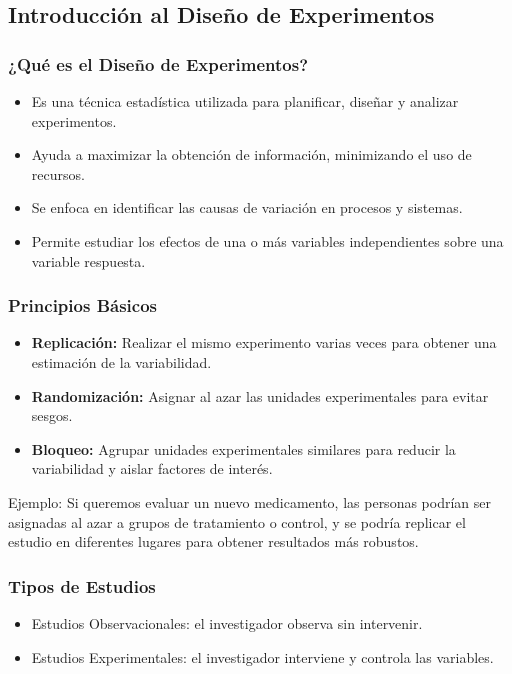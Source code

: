 \documentclass[aspectratio=169]{beamer}
\begin{document}
\subsection{Introducción al Diseño de Experimentos}
\begin{frame}
\frametitle{¿Qué es el Diseño de Experimentos?}
\begin{itemize}
    \item Es una técnica estadística utilizada para planificar, diseñar y analizar experimentos.
    \item Ayuda a maximizar la obtención de información, minimizando el uso de recursos.
    \item Se enfoca en identificar las causas de variación en procesos y sistemas.
    \item Permite estudiar los efectos de una o más variables independientes sobre una variable respuesta.
\end{itemize}
\end{frame}

\begin{frame}
\frametitle{Principios Básicos}
\begin{itemize}
    \item \textbf{Replicación:} Realizar el mismo experimento varias veces para obtener una estimación de la variabilidad.
    \item \textbf{Randomización:} Asignar al azar las unidades experimentales para evitar sesgos.
    \item \textbf{Bloqueo:} Agrupar unidades experimentales similares para reducir la variabilidad y aislar factores de interés.
\end{itemize}
Ejemplo: Si queremos evaluar un nuevo medicamento, las personas podrían ser asignadas al azar a grupos de tratamiento o control, y se podría replicar el estudio en diferentes lugares para obtener resultados más robustos.
\end{frame}


\begin{frame}
\frametitle{Tipos de Estudios}
\begin{itemize}
    \item Estudios Observacionales: el investigador observa sin intervenir.
    \item Estudios Experimentales: el investigador interviene y controla las variables.
\end{itemize}
\end{frame}
\end{document}
